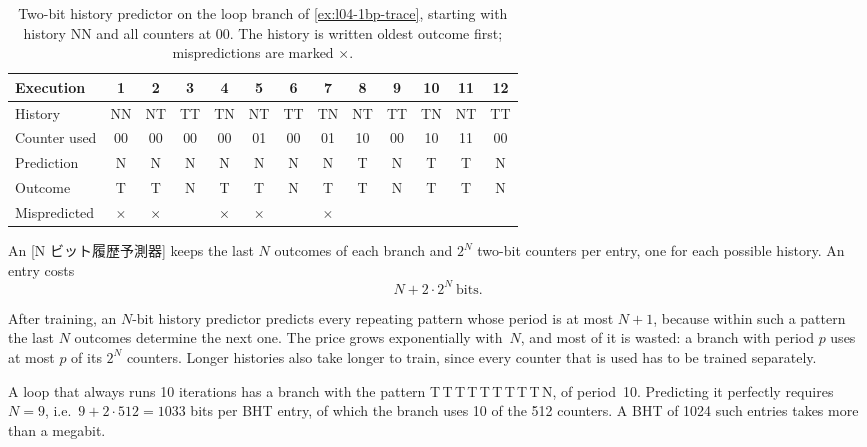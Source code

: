 \documentclass[../main.tex]{subfiles}
\begin{document}
\begin{table}[htbp]
  \centering\small
  \caption{Two-bit history predictor on the loop branch of
    \cref{ex:l04-1bp-trace}, starting with history NN and all counters at
    00.  The history is written oldest outcome first; mispredictions are
    marked $\times$.}
  \label{tab:l04-history-trace}
  \setlength{\tabcolsep}{3.6pt}
  \begin{tabular}{@{}lcccccccccccc@{}}
    \toprule
    Execution      & 1 & 2 & 3 & 4 & 5 & 6 & 7 & 8 & 9 & 10 & 11 & 12 \\
    \midrule
    History        & NN & NT & TT & TN & NT & TT & TN & NT & TT & TN & NT & TT \\
    Counter used   & 00 & 00 & 00 & 00 & 01 & 00 & 01 & 10 & 00 & 10 & 11 & 00 \\
    Prediction     & N & N & N & N & N & N & N & T & N & T & T & N \\
    Outcome        & T & T & N & T & T & N & T & T & N & T & T & N \\
    Mispredicted   & $\times$ & $\times$ & & $\times$ & $\times$ & & $\times$ & & & & & \\
    \bottomrule
  \end{tabular}
\end{table}

\begin{definition}
  An [N ビット履歴予測器]
  keeps the last $N$ outcomes of each branch and $2^N$ two-bit counters per
  entry, one for each possible history.  An entry costs
  \begin{equation}
    N + 2 \cdot 2^N \ \text{bits}.
    \label{eq:l04-history-cost}
  \end{equation}
\end{definition}

After training, an $N$-bit history predictor predicts every repeating
pattern whose period is at most $N+1$, because within such a pattern the
last $N$ outcomes determine the next one.  The price grows exponentially
with~$N$, and most of it is wasted: a branch with period $p$ uses at most $p$
of its $2^N$ counters.  Longer histories also take longer to train, since
every counter that is used has to be trained separately.

\begin{example}
  \label{ex:l04-history-cost}
  A loop that always runs 10 iterations has a branch with the pattern
  T\,T\,T\,T\,T\,T\,T\,T\,T\,N, of period~10.  Predicting it perfectly requires
  $N = 9$, i.e.\ $9 + 2\cdot 512 = 1033$ bits per BHT entry, of which the
  branch uses 10 of the 512 counters.  A BHT of 1024 such entries takes more
  than a megabit.
\end{example}
\end{document}
